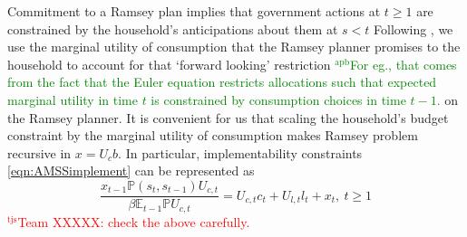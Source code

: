 \documentclass[12pt]{article}
\newcommand{\apb}[1]{\textcolor{green}{$^{\textrm{apb}}${#1}}}
\newcommand{\tjs}[1]{\textcolor{red}{$^{\textrm{tjs}}${#1}}}
\newcommand{\EE}{\mathbb E}
\begin{document}
  Commitment to a Ramsey plan implies that government actions at $t \geq 1$ are constrained by the household's anticipations about them at $s < t$
	 Following \citet{Kydland1980}, we  use the  marginal utility of consumption that the
Ramsey planner promises to the household to account for that `forward looking' restriction \apb{For eg., that comes from the fact that the Euler equation restricts allocations such that expected marginal utility in time $t$ is constrained by consumption choices in time $t-1$. }on the Ramsey planner.  It is convenient for us that scaling the household's  budget constraint by the  marginal utility
 of consumption makes Ramsey problem  recursive in  $x=U_c b$.  In particular, implementability constraints \eqref{eqn:AMSSimplement}
 can be represented as
		\begin{equation}
		\frac{x_{t-1} \mathbb{P}(s_t,s_{t-1}) U_{c,t}}{\beta \EE_{t-1} \mathbb{P}U_{c,t}}  = U_{c,t}c_t+U_{l,t} l_t + x_t, \ t \geq 1
	\end{equation}
\tjs{Team XXXXX: check the above carefully.}
\end{document}
